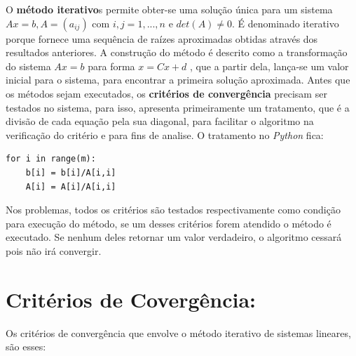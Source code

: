 \documentclass[
12pt,				%
openright,			%
twoside,			%
a4paper,			%
english,			%
french,				%
spanish,			%
brazil				%
]{abntex2_new}
\begin{document}
		O \textbf{método iterativo}s permite obter-se uma solução única para um sistema
		$Ax=b, A = (a_{ij} ) $ com 
		$i,j=1,...,n$ e $det(A) \neq 0$. É denominado iterativo porque fornece uma
		sequência de raízes aproximadas
		obtidas através dos resultados anteriores. A construção do método é descrito
		como a transformação do 
		sistema $Ax = b$ para forma $x = Cx + d$ , que a partir dela, lança-se um valor
		inicial para o sistema, 
		para encontrar a primeira solução aproximada. Antes que os métodos sejam executados, os \textbf{critérios de convergência}
		precisam ser testados no sistema, para isso,  apresenta 
		primeiramente um tratamento, que é a divisão de cada equação pela sua diagonal,
		para
		facilitar o algoritmo na verificação do critério e para fins de analise.
		O tratamento no \textit{Python} fica:
		\begin{lstlisting}
for i in range(m):
	b[i] = b[i]/A[i,i]
	A[i] = A[i]/A[i,i]\end{lstlisting}
		Nos problemas, todos os critérios são testados respectivamente como condição
		para
		execução do método, se um desses critérios forem atendido o método é executado.
		Se nenhum deles retornar um valor verdadeiro, o algoritmo cessará pois não irá
		convergir.
		
		\section{Critérios de Covergência:}	
		
		Os critérios de convergência que envolve o método iterativo de sistemas lineares, são
		esses:
		
\end{document}
